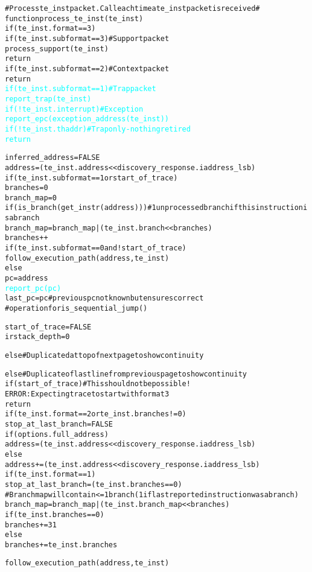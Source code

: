 \begin{alltt}
# Process te_inst packet.  Call each time a te_inst packet is received #
function process_te_inst (te_inst)
  if (te_inst.format == 3)
    if (te_inst.subformat == 3) # Support packet
      process_support(te_inst)
      return
    if (te_inst.subformat == 2) # Context packet
      return
    \textcolor{cyan}{if (te_inst.subformat == 1) # Trap packet}
      \textcolor{cyan}{report_trap(te_inst)}
      \textcolor{cyan}{if (!te_inst.interrupt) # Exception}
        \textcolor{cyan}{report_epc(exception_address(te_inst))}
      \textcolor{cyan}{if (!te_inst.thaddr) # Trap only - nothing retired}
        \textcolor{cyan}{return}

    inferred_address = FALSE
    address       = (te_inst.address << discovery_response.iaddress_lsb)
    if (te_inst.subformat == 1 or start_of_trace)
      branches    = 0
      branch_map  = 0
    if (is_branch(get_instr(address))) # 1 unprocessed branch if this instruction is a branch
      branch_map = branch_map | (te_inst.branch << branches)
      branches++
    if (te_inst.subformat == 0 and !start_of_trace)
      follow_execution_path(address, te_inst)
    else
      pc           = address
      \textcolor{cyan}{report_pc(pc)}
      last_pc      = pc # previous pc not known but ensures correct
                        #  operation for is_sequential_jump()

    start_of_trace = FALSE
    irstack_depth  = 0

  else # Duplicated at top of next page to show continuity
\end{alltt}
\pagebreak

\begin{alltt}
  else # Duplicate of last line from previous page to show continuity
    if (start_of_trace) # This should not be possible!
      ERROR: Expecting trace to start with format 3
      return
    if (te_inst.format == 2 or te_inst.branches != 0)
      stop_at_last_branch = FALSE
      if (options.full_address)
        address  = (te_inst.address << discovery_response.iaddress_lsb)
      else
        address += (te_inst.address << discovery_response.iaddress_lsb)
    if (te_inst.format == 1)
      stop_at_last_branch = (te_inst.branches == 0)
      # Branch map will contain <= 1 branch (1 if last reported instruction was a branch)
      branch_map = branch_map | (te_inst.branch_map << branches)
      if (te_inst.branches == 0)
        branches += 31
      else
        branches += te_inst.branches

    follow_execution_path(address, te_inst)
\end{alltt}

